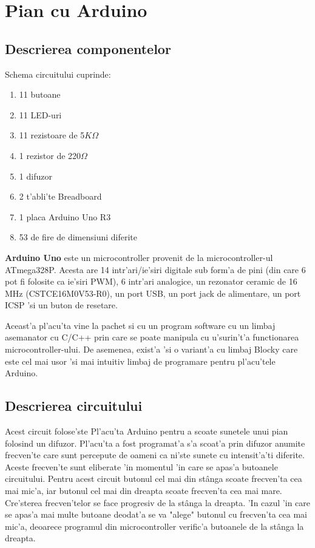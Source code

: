 \chapter{Pian cu Arduino}
\section {Descrierea componentelor}
\myindent

\vspace{5mm}
Schema circuitului cuprinde: 
\begin{enumerate}
\color{ForestGreen}
\item 11 butoane
\item 11 LED-uri
\item 11 rezistoare de 5$K\Omega$
\item 1 rezistor de 220$\Omega$
\item 1 difuzor
\item 2 t'abli'te Breadboard
\item 1 placa Arduino Uno R3
\item 53 de fire de dimensiuni diferite
\end{enumerate}

\vspace{5mm}
\myindent
\textbf {Arduino Uno} este un microcontroller provenit de la microcontroller-ul ATmega328P. Acesta are 14 intr'ari/ie'siri digitale sub form'a de pini (din care 6 pot fi folosite ca ie'siri PWM), 6 intr'ari analogice, un rezonator ceramic de 16 MHz (CSTCE16M0V53-R0), un port USB, un port jack de alimentare, un port ICSP 'si un buton de resetare.

Aceast'a pl'acu'ta vine la pachet si cu un program software cu un limbaj asemanator cu C/C++ prin care se poate manipula cu u'surin't'a functionarea microcontroller-ului. De asemenea, exist'a 'si o variant'a cu limbaj Blocky care este cel mai usor 'si mai intuitiv limbaj de programare pentru pl'acu'tele Arduino.

\section{Descrierea circuitului}
\myindent
Acest circuit folose'ste Pl'acu'ta Arduino pentru a scoate sunetele unui pian folosind un difuzor. Pl'acu'ta a fost programat'a s'a scoat'a prin difuzor anumite frecven'te care sunt percepute de oameni ca ni'ste sunete cu intensit'a'ti diferite. Aceste frecven'te sunt eliberate 'in momentul 'in care se apas'a butoanele circuitului. Pentru acest circuit butonul cel mai din st\^anga scoate frecven'ta cea mai mic'a, iar butonul cel mai din dreapta scoate frecven'ta cea mai mare. Cre'sterea frecven'telor se face progresiv de la st\^anga la dreapta. 'In cazul 'in care se apas'a mai multe butoane deodat'a se va "alege" butonul cu frecven'ta cea mai mic'a, deoarece programul din microcontroller verific'a butoanele de la st\^anga la dreapta.\\

